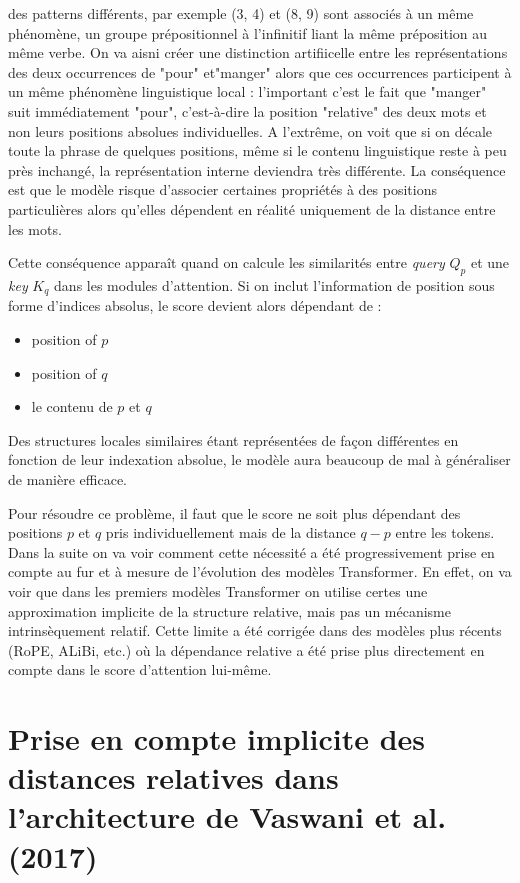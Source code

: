 \documentclass{article}
\begin{document}
des patterns différents, par exemple  (3, 4) et (8, 9) sont associés à un même phénomène, un groupe prépositionnel à l'infinitif liant la même préposition au même verbe. On va aisni créer une distinction artifiicelle entre les représentations des deux occurrences de "pour" et"manger"   alors que ces occurrences participent à un même phénomène linguistique local : l'important c'est le fait que "manger" suit immédiatement "pour", c'est-à-dire la position "relative" des deux mots et non leurs positions absolues individuelles. A l'extrême, on voit que si on décale toute la phrase de quelques positions, même si le contenu linguistique reste à peu près  inchangé, la représentation interne deviendra très différente. La conséquence est que le modèle risque d'associer certaines propriétés à des positions particulières alors qu'elles dépendent en réalité uniquement de la distance entre les mots.

Cette conséquence apparaît quand on calcule les similarités entre \textit{query} $Q_p$ et une \textit{key} $K_q$ dans les modules d'attention. Si on inclut l'information de position sous forme d'indices absolus, le score devient alors dépendant de :
\begin{itemize}
   \item position of $p$ 
    \item position of $q$
    \item le contenu de $p$ et $q$
   \end{itemize}
   
 Des structures locales similaires étant représentées de façon différentes en fonction de leur indexation absolue, le modèle aura beaucoup de mal à généraliser de manière efficace.
 
 Pour résoudre ce problème, il faut que le score ne soit plus dépendant des positions $p$ et $q$ pris individuellement mais de la distance $q-p$ entre les tokens. Dans la suite on va voir comment cette nécessité a été progressivement prise en compte au fur et à mesure de l'évolution des modèles Transformer. En effet, on va voir que dans les premiers modèles Transformer on utilise certes une approximation implicite de la structure relative, mais pas un mécanisme intrinsèquement relatif. Cette limite a été corrigée dans des modèles plus récents (RoPE, ALiBi, etc.) où la dépendance relative  a été prise plus directement en compte dans le score d’attention lui-même.

 \section{Prise en compte implicite des distances relatives dans l’architecture de Vaswani et al. (2017)}
 
\end{document}
